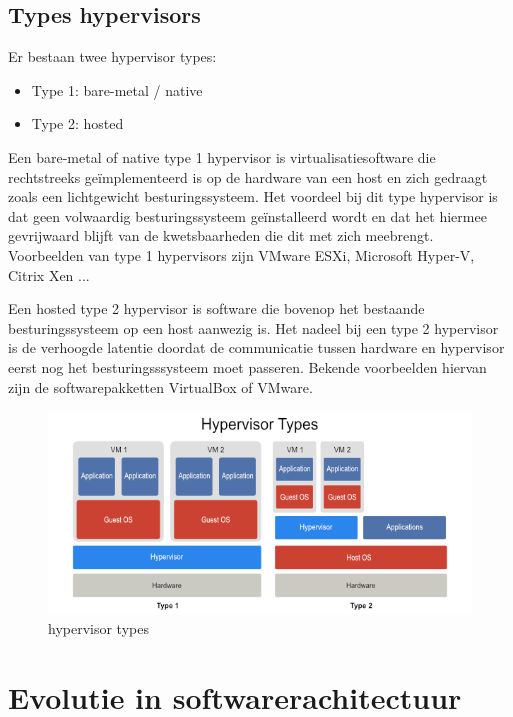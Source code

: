 \subsection{Types hypervisors}

Er bestaan twee hypervisor types:
\begin{itemize}
    \item Type 1: bare-metal / native
    \item Type 2: hosted
\end{itemize}

Een bare-metal of native type 1 hypervisor is virtualisatiesoftware die rechtstreeks geïmplementeerd is op de hardware van een host en zich gedraagt zoals een lichtgewicht besturingssysteem. Het voordeel bij dit type hypervisor is dat geen volwaardig besturingssysteem geïnstalleerd wordt en dat het hiermee gevrijwaard blijft van de kwetsbaarheden die dit met zich meebrengt. Voorbeelden van type 1 hypervisors zijn VMware ESXi, Microsoft Hyper-V, Citrix Xen ... 

Een hosted type 2 hypervisor is software die bovenop het bestaande besturingssysteem op een host aanwezig is. Het nadeel bij een type 2 hypervisor is de verhoogde latentie doordat de communicatie tussen hardware en hypervisor eerst nog het besturingsssysteem moet passeren. Bekende voorbeelden hiervan zijn de softwarepakketten VirtualBox of VMware. 

\begin{figure}[h]
    \centering
    \includegraphics[scale=.6]{img/Hypervisor-Types.png}
    \caption{hypervisor types \autocite{Vembu2019}}
    \label{hypervisors}
\end{figure}


\section{Evolutie in softwarerachitectuur}

